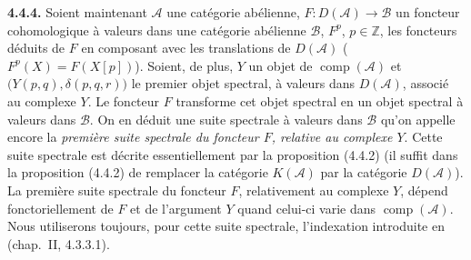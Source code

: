 \medskip\noindent\textbf{4.4.4.}\quad
Soient maintenant $\mathcal A$ une catégorie abélienne,
$F\colon D(\mathcal A)\longrightarrow\mathcal B$ un foncteur cohomologique
à valeurs dans une catégorie abélienne $\mathcal B$, $F^p$, $p\in\mathbb Z$,
les foncteurs déduits de $F$ en composant avec les translations de
$D(\mathcal A)$ ($F^p(X)=F(X[p])$). Soient, de plus, $Y$ un objet de
$\operatorname{comp}(\mathcal A)$ et
$\bigl(Y(p,q),\delta(p,q,r)\bigr)$ le premier objet spectral, à valeurs dans
$D(\mathcal A)$, associé au complexe $Y$. Le foncteur $F$ transforme cet
objet spectral en un objet spectral à valeurs dans $\mathcal B$. On en
déduit une suite spectrale à valeurs dans $\mathcal B$ qu'on appelle encore
la \emph{première suite spectrale du foncteur $F$, relative au complexe
$Y$}. Cette suite spectrale est décrite essentiellement par la proposition
(4.4.2) (il suffit dans la proposition (4.4.2) de remplacer la catégorie
$K(\mathcal A)$ par la catégorie $D(\mathcal A)$). La première suite
spectrale du foncteur $F$, relativement au complexe $Y$, dépend
fonctoriellement de $F$ et de l'argument $Y$ quand celui-ci varie dans
$\operatorname{comp}(\mathcal A)$. Nous utiliserons toujours, pour cette
suite spectrale, l'indexation introduite en (chap.~II, 4.3.3.1).
\endgroup
